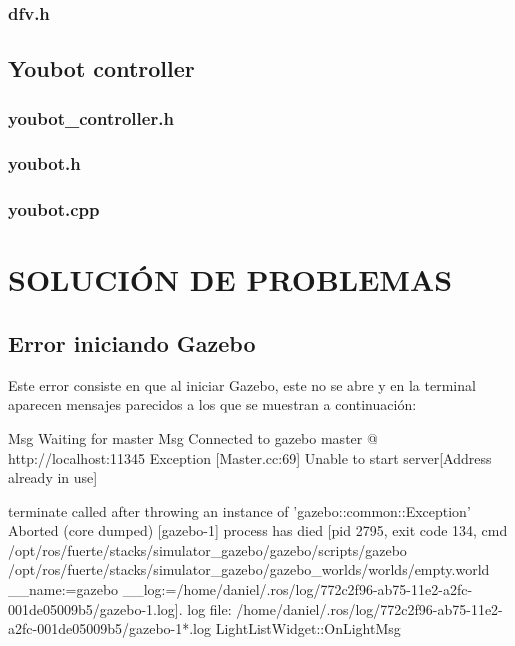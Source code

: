 \documentclass[12pt, a4paper]{report}
\begin{document}
\subsection{dfv.h}
\lstset{inputencoding=utf8/latin1}

\newpage

\section{Youbot controller}

\subsection{youbot\_controller.h}
\lstset{inputencoding=utf8/latin1}

\newpage

\subsection{youbot.h}
\lstset{inputencoding=utf8/latin1}

\newpage

\subsection{youbot.cpp}
\lstset{inputencoding=utf8/latin1}

\newpage

\fi

\chapter{SOLUCIÓN DE PROBLEMAS}

\section{Error iniciando Gazebo}

Este error consiste en que al iniciar Gazebo, este no se abre y en la terminal aparecen mensajes parecidos a los que se muestran a continuación:

\footnotesize\begin{spverbatim}
Msg Waiting for master
Msg Connected to gazebo master @ http://localhost:11345
Exception [Master.cc:69] Unable to start server[Address already in use]


terminate called after throwing an instance of 'gazebo::common::Exception'
Aborted (core dumped)
[gazebo-1] process has died [pid 2795, exit code 134, cmd /opt/ros/fuerte/stacks/simulator_gazebo/gazebo/scripts/gazebo /opt/ros/fuerte/stacks/simulator_gazebo/gazebo_worlds/worlds/empty.world __name:=gazebo __log:=/home/daniel/.ros/log/772c2f96-ab75-11e2-a2fc-001de05009b5/gazebo-1.log].
log file: /home/daniel/.ros/log/772c2f96-ab75-11e2-a2fc-001de05009b5/gazebo-1*.log
LightListWidget::OnLightMsg


\end{spverbatim}
\normalsize
\end{document}
